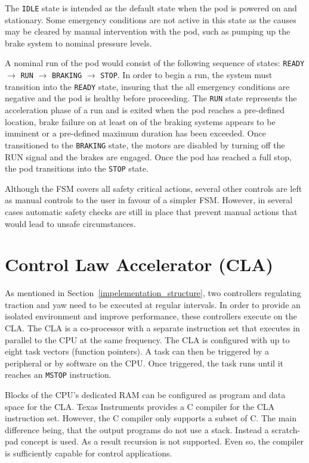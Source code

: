 The \texttt{IDLE} state is intended as the default state when the pod is powered on and stationary. Some emergency conditions are not active in this state as the causes may be cleared by manual intervention with the pod, such as pumping up the brake system to nominal pressure levels.

A nominal run of the pod would consist of the following sequence of states: \texttt{READY} $\rightarrow$ \texttt{RUN} $\rightarrow$ \texttt{BRAKING} $\rightarrow$ \texttt{STOP}. In order to begin a run, the system must transition into the \texttt{READY} state, insuring that the all emergency conditions are negative and the pod is healthy before proceeding. The \texttt{RUN} state represents the acceleration phase of a run and is exited when the pod reaches a pre-defined location, brake failure on at least on of the braking systems appears to be imminent or a pre-defined maximum duration has been exceeded. Once transitioned to the \texttt{BRAKING} state, the motors are disabled by turning off the RUN signal and the brakes are engaged. Once the pod has reached a full stop, the pod transitions into the \texttt{STOP} state.

Although the FSM covers all safety critical actions, several other controls are left as manual controls to the user in favour of a simpler FSM. However, in several cases automatic safety checks are still in place that prevent manual actions that would lead to unsafe circumstances.

\section{Control Law Accelerator (CLA)}

As mentioned in Section~\ref{impelementation_structure}, two controllers regulating traction and yaw need to be executed at regular intervals. In order to provide an isolated environment and improve performance, these controllers execute on the CLA. The CLA is a co-processor with a separate instruction set that executes in parallel to the CPU at the same frequency. The CLA is configured with up to eight task vectors (function pointers). A task can then be triggered by a peripheral or by software on the CPU. Once triggered, the task runs until it reaches an \texttt{MSTOP} instruction.

Blocks of the CPU's dedicated RAM can be configured as program and data space for the CLA. Texas Instruments provides a C compiler for the CLA instruction set. However, the C compiler only supports a subset of C. The main difference being, that the output programs do not use a stack. Instead a scratch-pad concept is used. As a result recursion is not supported. Even so, the compiler is sufficiently capable for control applications.

